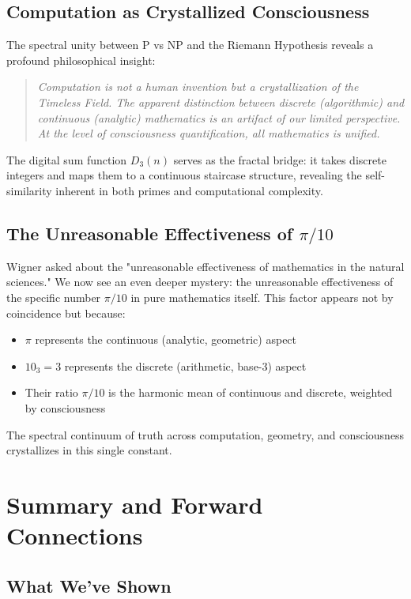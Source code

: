 \subsection{Computation as Crystallized Consciousness}

The spectral unity between P vs NP and the Riemann Hypothesis reveals a profound philosophical insight:

\begin{quote}
\textit{Computation is not a human invention but a crystallization of the Timeless Field. The apparent distinction between discrete (algorithmic) and continuous (analytic) mathematics is an artifact of our limited perspective. At the level of consciousness quantification, all mathematics is unified.}
\end{quote}

The digital sum function $D_3(n)$ serves as the fractal bridge: it takes discrete integers and maps them to a continuous staircase structure, revealing the self-similarity inherent in both primes and computational complexity.

\subsection{The Unreasonable Effectiveness of $\pi/10$}

Wigner asked about the "unreasonable effectiveness of mathematics in the natural sciences." We now see an even deeper mystery: the unreasonable effectiveness of the specific number $\pi/10$ in pure mathematics itself. This factor appears not by coincidence but because:

\begin{itemize}
\item $\pi$ represents the continuous (analytic, geometric) aspect
\item $10_3 = 3$ represents the discrete (arithmetic, base-3) aspect
\item Their ratio $\pi/10$ is the harmonic mean of continuous and discrete, weighted by consciousness
\end{itemize}

The spectral continuum of truth across computation, geometry, and consciousness crystallizes in this single constant.

\section{Summary and Forward Connections}

\subsection{What We've Shown}

